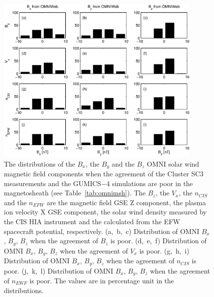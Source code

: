 \documentclass[linenumbers,draft]{agujournal}
\begin{document}
\begin{figure}[h]
\centering
\includegraphics[width=0.9\textwidth,angle=0]{swe-2020-corr-f17.eps}
\caption{The distributions of the $B_{x}$, the $B_{y}$  and the $B_{z}$ OMNI solar wind magnetic field components when the agreement of the Cluster SC3 measurements and the GUMICS$-$4 simulations are poor in the magnetosheath (see Table~\ref{tab:omnimsh}). The $B_{z}$, the $V_{x}$, the $n_{CIS}$ and the $n_{EFW}$ are the magnetic field GSE Z component, the plasma ion velocity X GSE component, the  solar wind density measured by the CIS HIA instrument and the calculated from the EFW spacecraft potential, respectively. (a,~b,~c) Distribution of OMNI $B_{x}$, $B_{y}$, $B_{z}$ when the agreement of $B_{z}$ is poor. (d,~e,~f) Distribution of OMNI  $B_{x}$, $B_{y}$, $B_{z}$ when the agreement of $V_{x}$ is poor. (g,~h,~i) Distribution of OMNI $B_{x}$, $B_{y}$, $B_{z}$ when the agreement of $n_{CIS}$ is poor. (j,~k,~l) Distribution of OMNI $B_{x}$, $B_{y}$, $B_{z}$ when the agreement of $n_{EWF}$ is poor. The values are in percentage unit in the distributions.}
\label{fig:mshomnibxyz}
\end{figure}

\pagebreak
\end{document}
